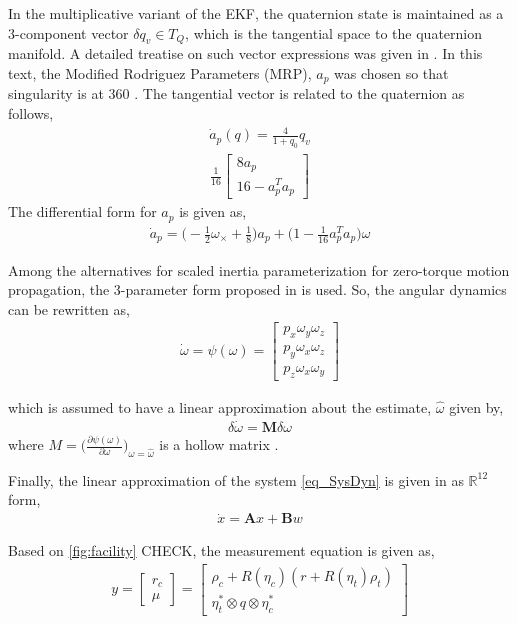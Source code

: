 In the multiplicative variant of the EKF, the quaternion state is maintained as a $3$-component vector $\delta q_v \in T_Q$, which is the tangential space to the quaternion manifold. A detailed treatise on such vector expressions was given in \cite{Markley}. In this text, the Modified Rodriguez Parameters (MRP), $a_p$ was chosen so that singularity is at $360$ \cite{Tweddle}. The tangential vector is related to the quaternion as follows,
\begin{align}
\dot{a}_p(q) = \frac{4}{1+q_0}q_v
\end{align}
\begin{align}
\frac{1}{16}\begin{bmatrix}
8a_p \\ 16 - a_p^Ta_p
\end{bmatrix}
\end{align}
The differential form for $a_p$ is given as,
\begin{align}
\dot{a}_p = \Big(-\frac{1}{2}\omega_\times + \frac{1}{8}\Big)a_p + \Big(1 - \frac{1}{16}a_p^Ta_p\Big)\omega	 
\end{align}


Among the alternatives for scaled inertia parameterization for zero-torque motion propagation, \cite[\S 4.6]{TweddlePhD} the $3$-parameter form proposed in \cite{Aghili07} is used. So, the angular dynamics can be rewritten as,
\begin{align}
 \dot{\omega} = \psi(\omega) =  \begin{bmatrix}
 p_x \omega_y \omega_z \\
  p_y \omega_x \omega_z \\
   p_z \omega_x \omega_y  
 \end{bmatrix}
\end{align}
 
which is assumed to have a linear approximation about the estimate, $\hat{\omega}$ given by,
\begin{align}
	\delta \dot{\omega} = \mathbf{M}\delta{\omega}
\end{align} where $M = \Big( \frac{\partial \psi(\omega)}{\partial \omega}\Big)_{\omega = \hat{\omega}}$ is a hollow matrix \cite{Aghili07}.

Finally, the linear approximation of the system \eqref{eq_SysDyn} is given in \cite[eq. 4.79]{TweddlePhD} as $\mathbb{R}^{12}$ form,
\begin{align}
\dot{x} = \mathbf{A}x + \mathbf{B}w
\end{align}

Based on \ref{fig:facility} CHECK, the measurement equation is given as,
\begin{align}
y = \begin{bmatrix}
r_c \\ \mu \end{bmatrix} = \begin{bmatrix}
\rho_c + R(\eta_c)(r + R(\eta_t)\rho_t) \\
\eta_t^*\otimes q \otimes \eta_c^*
\end{bmatrix}
\end{align}

